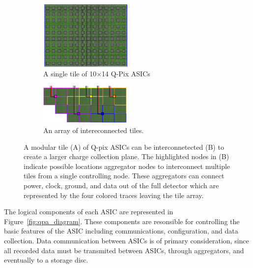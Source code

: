 \begin{figure}[]
\centering
\begin{subfigure}{.5\textwidth}
  \centering
  \includegraphics[width=0.5\textwidth]{images/single_tile_qpix.png}
  \caption{A single tile of 10$\times$14 Q-Pix ASICs}
\end{subfigure}%
\begin{subfigure}{.5\textwidth}
  \centering
  \includegraphics[width=0.5\textwidth]{images/array_of_tiles_qpix.png}
  \caption{An array of intereconnected tiles.}
\end{subfigure}
\caption{A modular tile (A) of Q-pix ASICs can be interconnetected (B) to create a larger charge collection plane. 
The highlighted nodes in (B) indicate possible locations aggregator nodes to interconnect multiple tiles from a single controlling node.
These aggregators can connect power, clock, ground, and data out of the full detector which are represented by the four colored traces leaving the tile array.
}
\label{fig:qpix_tile_introduction}
\end{figure}

The logical components of each ASIC are represented in Figure~\ref{fig:qpa_diagram}.
These components are resonsible for controlling the basic features of the ASIC including communications, configuration, and data collection.
Data communication between ASICs is of primary consideration, since all recorded data must be transmited between ASICs, through aggregators, and eventually to a storage disc.

